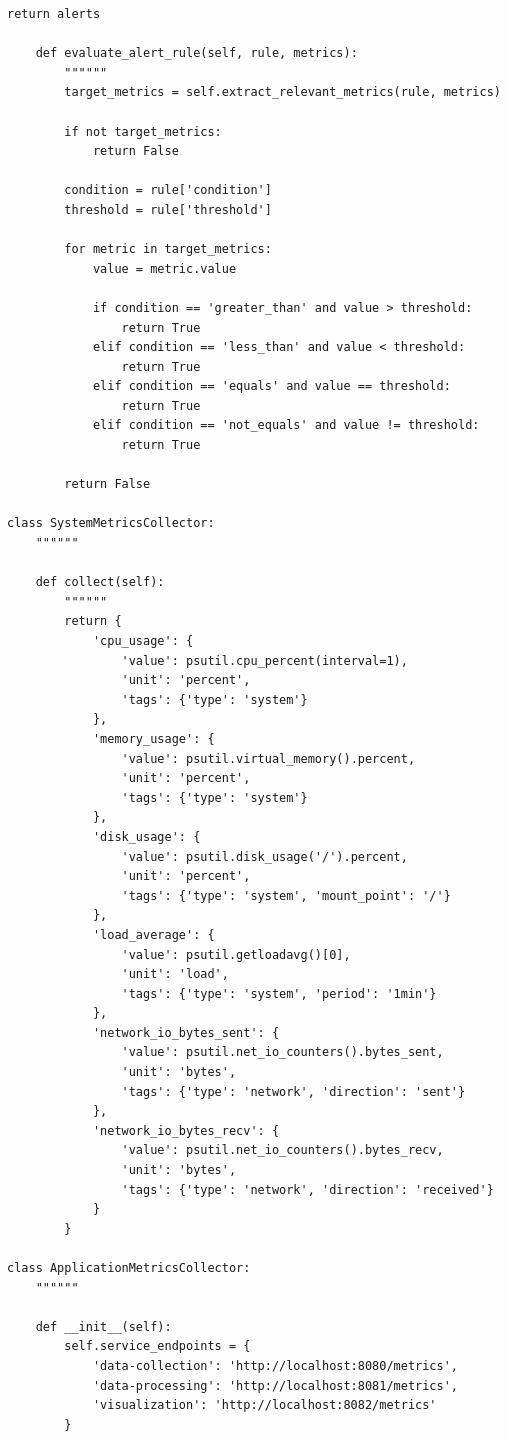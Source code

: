 \begin{lstlisting}[style=python]
        return alerts
    
    def evaluate_alert_rule(self, rule, metrics):
        """"""
        target_metrics = self.extract_relevant_metrics(rule, metrics)
        
        if not target_metrics:
            return False
        
        condition = rule['condition']
        threshold = rule['threshold']
        
        for metric in target_metrics:
            value = metric.value
            
            if condition == 'greater_than' and value > threshold:
                return True
            elif condition == 'less_than' and value < threshold:
                return True
            elif condition == 'equals' and value == threshold:
                return True
            elif condition == 'not_equals' and value != threshold:
                return True
        
        return False

class SystemMetricsCollector:
    """"""
    
    def collect(self):
        """"""
        return {
            'cpu_usage': {
                'value': psutil.cpu_percent(interval=1),
                'unit': 'percent',
                'tags': {'type': 'system'}
            },
            'memory_usage': {
                'value': psutil.virtual_memory().percent,
                'unit': 'percent',
                'tags': {'type': 'system'}
            },
            'disk_usage': {
                'value': psutil.disk_usage('/').percent,
                'unit': 'percent',
                'tags': {'type': 'system', 'mount_point': '/'}
            },
            'load_average': {
                'value': psutil.getloadavg()[0],
                'unit': 'load',
                'tags': {'type': 'system', 'period': '1min'}
            },
            'network_io_bytes_sent': {
                'value': psutil.net_io_counters().bytes_sent,
                'unit': 'bytes',
                'tags': {'type': 'network', 'direction': 'sent'}
            },
            'network_io_bytes_recv': {
                'value': psutil.net_io_counters().bytes_recv,
                'unit': 'bytes',
                'tags': {'type': 'network', 'direction': 'received'}
            }
        }

class ApplicationMetricsCollector:
    """"""
    
    def __init__(self):
        self.service_endpoints = {
            'data-collection': 'http://localhost:8080/metrics',
            'data-processing': 'http://localhost:8081/metrics',
            'visualization': 'http://localhost:8082/metrics'
        }
    

\end{lstlisting}
